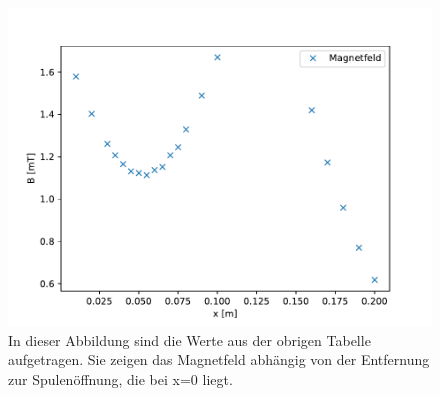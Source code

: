 \documentclass[titlepage = firstcover]{scrartcl}
\begin{document}
            \begin{figure}[h]
                \centering
                \includegraphics{HelmholtzB.pdf}
                \caption{In dieser Abbildung sind die Werte aus der obrigen Tabelle aufgetragen. Sie zeigen das Magnetfeld abhängig von der Entfernung zur Spulenöffnung, die bei x=0 liegt.}
                \label{fig:HelmholtzB}

            \end{figure}

            \FloatBarrier
            \newpage
\end{document}
